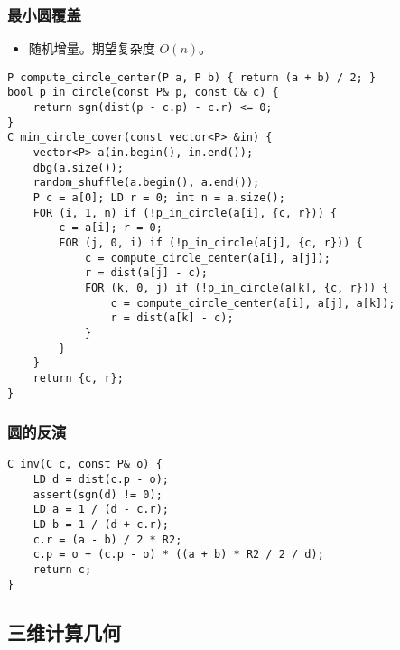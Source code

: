 \documentclass[]{article}
\providecommand{\tightlist}{%
  \setlength{\itemsep}{0pt}\setlength{\parskip}{0pt}}
\begin{document}
\hypertarget{ux6700ux5c0fux5706ux8986ux76d6}{%
\subsubsection{最小圆覆盖}\label{ux6700ux5c0fux5706ux8986ux76d6}}

\begin{itemize}
\tightlist
\item
  随机增量。期望复杂度 \(O(n)\)。
\end{itemize}

\begin{verbatim}
P compute_circle_center(P a, P b) { return (a + b) / 2; }
bool p_in_circle(const P& p, const C& c) {
    return sgn(dist(p - c.p) - c.r) <= 0;
}
C min_circle_cover(const vector<P> &in) {
    vector<P> a(in.begin(), in.end());
    dbg(a.size());
    random_shuffle(a.begin(), a.end());
    P c = a[0]; LD r = 0; int n = a.size();
    FOR (i, 1, n) if (!p_in_circle(a[i], {c, r})) {
        c = a[i]; r = 0;
        FOR (j, 0, i) if (!p_in_circle(a[j], {c, r})) {
            c = compute_circle_center(a[i], a[j]);
            r = dist(a[j] - c);
            FOR (k, 0, j) if (!p_in_circle(a[k], {c, r})) {
                c = compute_circle_center(a[i], a[j], a[k]);
                r = dist(a[k] - c);
            }
        }
    }
    return {c, r};
}
\end{verbatim}

\hypertarget{ux5706ux7684ux53cdux6f14}{%
\subsubsection{圆的反演}\label{ux5706ux7684ux53cdux6f14}}

\begin{verbatim}
C inv(C c, const P& o) {
    LD d = dist(c.p - o);
    assert(sgn(d) != 0);
    LD a = 1 / (d - c.r);
    LD b = 1 / (d + c.r);
    c.r = (a - b) / 2 * R2;
    c.p = o + (c.p - o) * ((a + b) * R2 / 2 / d);
    return c;
}
\end{verbatim}

\hypertarget{ux4e09ux7ef4ux8ba1ux7b97ux51e0ux4f55}{%
\subsection{三维计算几何}\label{ux4e09ux7ef4ux8ba1ux7b97ux51e0ux4f55}}
\end{document}

